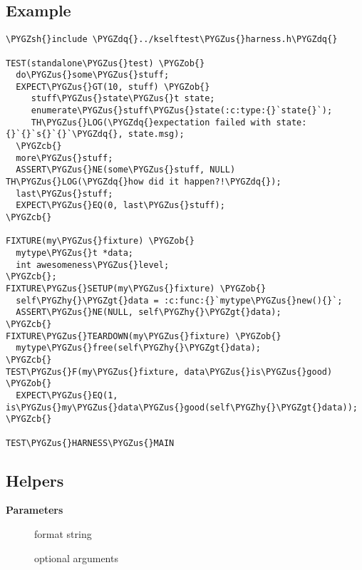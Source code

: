 \documentclass[a4paper,8pt,english]{sphinxmanual}
\def\PYGZus{\char`\_}
\def\PYGZob{\char`\{}
\def\PYGZcb{\char`\}}
\def\PYGZgt{\char`\>}
\def\PYGZsh{\char`\#}
\def\PYGZhy{\char`\-}
\def\PYGZdq{\char`\"}
\begin{document}
\subsection{Example}
\label{dev-tools/kselftest:example}
\begin{Verbatim}[commandchars=\\\{\}]
\PYGZsh{}include \PYGZdq{}../kselftest\PYGZus{}harness.h\PYGZdq{}

TEST(standalone\PYGZus{}test) \PYGZob{}
  do\PYGZus{}some\PYGZus{}stuff;
  EXPECT\PYGZus{}GT(10, stuff) \PYGZob{}
     stuff\PYGZus{}state\PYGZus{}t state;
     enumerate\PYGZus{}stuff\PYGZus{}state(:c:type:{}`state{}`);
     TH\PYGZus{}LOG(\PYGZdq{}expectation failed with state: {}`{}`s{}`{}`\PYGZdq{}, state.msg);
  \PYGZcb{}
  more\PYGZus{}stuff;
  ASSERT\PYGZus{}NE(some\PYGZus{}stuff, NULL) TH\PYGZus{}LOG(\PYGZdq{}how did it happen?!\PYGZdq{});
  last\PYGZus{}stuff;
  EXPECT\PYGZus{}EQ(0, last\PYGZus{}stuff);
\PYGZcb{}

FIXTURE(my\PYGZus{}fixture) \PYGZob{}
  mytype\PYGZus{}t *data;
  int awesomeness\PYGZus{}level;
\PYGZcb{};
FIXTURE\PYGZus{}SETUP(my\PYGZus{}fixture) \PYGZob{}
  self\PYGZhy{}\PYGZgt{}data = :c:func:{}`mytype\PYGZus{}new(){}`;
  ASSERT\PYGZus{}NE(NULL, self\PYGZhy{}\PYGZgt{}data);
\PYGZcb{}
FIXTURE\PYGZus{}TEARDOWN(my\PYGZus{}fixture) \PYGZob{}
  mytype\PYGZus{}free(self\PYGZhy{}\PYGZgt{}data);
\PYGZcb{}
TEST\PYGZus{}F(my\PYGZus{}fixture, data\PYGZus{}is\PYGZus{}good) \PYGZob{}
  EXPECT\PYGZus{}EQ(1, is\PYGZus{}my\PYGZus{}data\PYGZus{}good(self\PYGZhy{}\PYGZgt{}data));
\PYGZcb{}

TEST\PYGZus{}HARNESS\PYGZus{}MAIN
\end{Verbatim}


\subsection{Helpers}
\label{dev-tools/kselftest:helpers}

\begin{fulllineitems}
\label{dev-tools/kselftest:c.TH_LOG}
\end{fulllineitems}


\textbf{Parameters}
\begin{description}
\item[{}] \leavevmode
format string

\item[{}] \leavevmode
optional arguments

\end{description}
\end{document}
